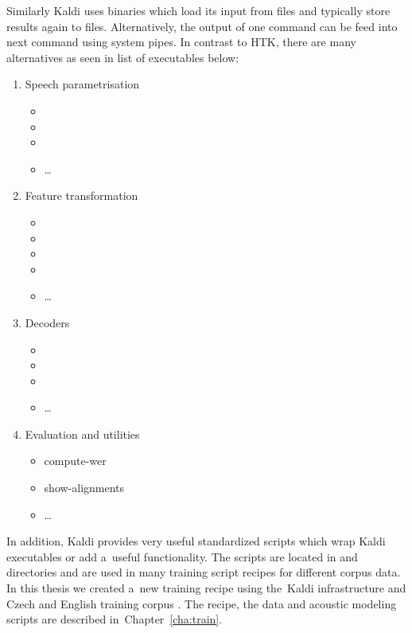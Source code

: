 {Similarly Kaldi uses binaries which load its input from files and typically store results again to files.
Alternatively, the output of one command can be feed into next command using system pipes.
In contrast to \ac{HTK}, there are many alternatives as seen in list of executables below:
\begin{enumerate}
    \item Speech parametrisation
        \begin{itemize}
            \item {}
            \item {}
            \item {}
            \item \ldots
        \end{itemize}
    \item Feature transformation
        \begin{itemize}
            \item {}
            \item {}
            \item {}
            \item {}
            \item \ldots
        \end{itemize}
    \item Decoders
        \begin{itemize}
            \item {}
            \item {}
            \item {}
            \item \ldots
        \end{itemize}
    \item Evaluation and utilities
        \begin{itemize}
            \item compute-wer
            \item show-alignments
            \item \ldots
        \end{itemize}
\end{enumerate}
In addition, Kaldi provides very useful standardized scripts which wrap Kaldi executables or add a~useful functionality. 
The scripts are located in  and  directories and are used in many training script recipes for different corpus data.
In this thesis we created a~new training recipe using the~Kaldi infrastructure and Czech and English training corpus \cite{korvas_2014}.
The recipe, the data and acoustic modeling scripts are described in~Chapter~\ref{cha:train}.

}
